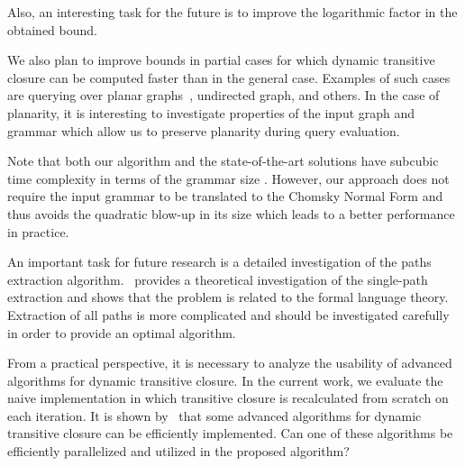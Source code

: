 Also, an interesting task for the future is to improve the logarithmic factor in the obtained bound.


We also plan to improve bounds in partial cases for which dynamic transitive closure can be computed faster than in the general case.
Examples of such cases are querying over planar graphs~\citep{10.1007/3-540-57273-2_72}, undirected graph, and others.
In the case of planarity, it is interesting to investigate properties of the input graph and grammar which allow us to preserve planarity during query evaluation.

Note that both our algorithm and the state-of-the-art solutions have subcubic time complexity in terms of the grammar size \citep{Azimov:2018:CPQ:3210259.3210264, hellingsRelational, hellingsPathQuerying, 10.1145/258994.259006, 10.1145/3398682.3399163}.
However, our approach does not require the input grammar to be translated to the Chomsky Normal Form and thus avoids the quadratic blow-up in its size which leads to a better performance in practice.


An important task for future research is a detailed investigation of the paths extraction algorithm.~\cite{HellSinglePath} provides a theoretical investigation of the single-path extraction and shows that the problem is related to the formal language theory.
Extraction of all paths is more complicated and should be investigated carefully in order to provide an optimal algorithm.


From a practical perspective, it is necessary to analyze the usability of advanced algorithms for dynamic transitive closure.
In the current work, we evaluate the naive implementation in which transitive closure is recalculated from scratch on each iteration.
It is shown by~\cite{cs6345} that some advanced algorithms for dynamic transitive closure can be efficiently implemented.
Can one of these algorithms be efficiently parallelized and utilized in the proposed algorithm?


